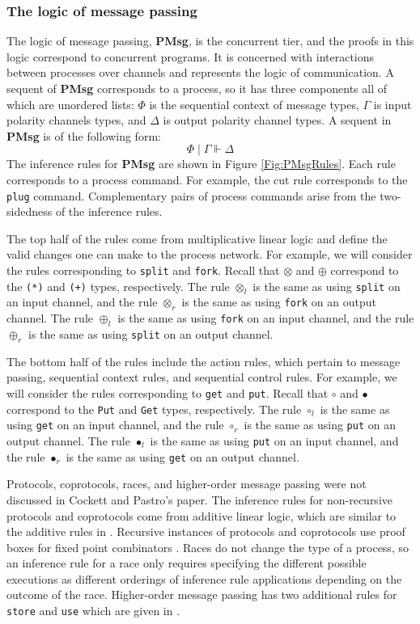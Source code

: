 \documentclass[11pt]{article}
\begin{document}
\subsubsection{The logic of message passing}
	
The logic of message passing, {\bf PMsg}, is the concurrent tier, and the proofs in this logic correspond to concurrent programs. 
It is concerned with interactions between processes over channels and represents the logic of communication. 
A sequent of {\bf PMsg} corresponds to a process, so it has three components all of which are unordered lists: $\Phi$ is the sequential context of message types, $\Gamma$ is input polarity channels types, and $\Delta$ is output polarity channel types. A sequent in {\bf PMsg} is of the following form:
\[ \Phi \mid \Gamma \Vdash \Delta \]	
The inference rules for {\bf PMsg} are shown in Figure \ref{Fig:PMsgRules}. 
Each rule corresponds to a process command.
For example, the cut rule corresponds to the \lstinline{plug} command.
Complementary pairs of process commands arise from the two-sidedness of the inference rules.

The top half of the rules come from multiplicative linear logic and define the valid changes one can make to the process network.
For example, we will consider the rules corresponding to \lstinline{split} and \lstinline{fork}. 
Recall that $\otimes$ and $\oplus$ correspond to the \lstinline{(*)} and \lstinline{(+)} types, respectively. 
The rule $\otimes_l$ is the same as using \lstinline{split} on an input channel, and the rule $\otimes_r$ is the same as using \lstinline{fork} on an output channel. 
The rule $\oplus_l$ is the same as using \lstinline{fork} on an input channel, and the rule $\oplus_r$ is the same as using \lstinline{split} on an output channel.

The bottom half of the rules include the action rules, which pertain to message passing, sequential context rules, and sequential control rules.
For example, we will consider the rules corresponding to \lstinline{get} and \lstinline{put}.
Recall that $\circ$ and $\bullet$ correspond to the \lstinline{Put} and \lstinline{Get} types, respectively. 
The rule $\circ_l$ is the same as using \lstinline{get} on an input channel, and the rule $\circ_r$ is the same as using \lstinline{put} on an output channel.
The rule $\bullet_l$ is the same as using \lstinline{put} on an input channel, and the rule $\bullet_r$ is the same as using \lstinline{get} on an output channel.


Protocols, coprotocols, races, and higher-order message passing were not discussed in Cockett and Pastro's paper.
The inference rules for non-recursive protocols and coprotocols come from additive linear logic, which are similar to the additive rules in \cite{CoP04}.
Recursive instances of protocols and coprotocols use proof boxes for fixed point combinators \cite{Ye12}.
Races do not change the type of a process, so an inference rule for a race only requires specifying the different possible executions as different orderings of inference rule applications depending on the outcome of the race.
Higher-order message passing has two additional rules for \lstinline{store} and \lstinline{use} which are given in \cite{No25}.
\end{document}
